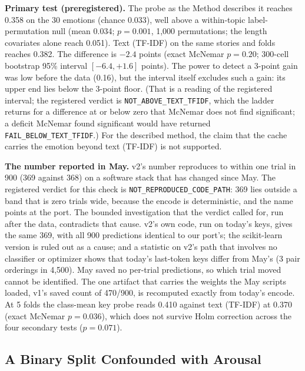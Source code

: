 \textbf{Primary test (preregistered).} The probe as the Method describes it reaches 0.358 on the 30 emotions (chance 0.033), well above a within-topic label-permutation null (mean 0.034; $p = 0.001$, 1{,}000 permutations; the length covariates alone reach 0.051). Text (TF-IDF) on the same stories and folds reaches 0.382. The difference is $-2.4$ points (exact McNemar $p = 0.20$; 300-cell bootstrap 95\% interval $[-6.4, +1.6]$ points). The power to detect a 3-point gain was low before the data (0.16), but the interval itself excludes such a gain: its upper end lies below the 3-point floor. (That is a reading of the registered interval; the registered verdict is \texttt{NOT\_ABOVE\_TEXT\_TFIDF}, which the ladder returns for a difference at or below zero that McNemar does not find significant; a deficit McNemar found significant would have returned \texttt{FAIL\_BELOW\_TEXT\_TFIDF}.) For the described method, the claim that the cache carries the emotion beyond text (TF-IDF) is not supported.

\textbf{The number reported in May.} v2's number reproduces to within one trial in 900 (369 against 368) on a software stack that has changed since May. The registered verdict for this check is \texttt{NOT\_REPRODUCED\_CODE\_PATH}: 369 lies outside a band that is zero trials wide, because the encode is deterministic, and the name points at the port. The bounded investigation that the verdict called for, run after the data, contradicts that cause. v2's own code, run on today's keys, gives the same 369, with all 900 predictions identical to our port's; the scikit-learn version is ruled out as a cause; and a statistic on v2's path that involves no classifier or optimizer shows that today's last-token keys differ from May's (3 pair orderings in 4{,}500). May saved no per-trial predictions, so which trial moved cannot be identified. The one artifact that carries the weights the May scripts loaded, v1's saved count of 470/900, is recomputed exactly from today's encode. At 5 folds the class-mean key probe reads 0.410 against text (TF-IDF) at 0.370 (exact McNemar $p = 0.036$), which does not survive Holm correction across the four secondary tests ($p = 0.071$).

\subsection{A Binary Split Confounded with Arousal}
\label{sec:valence_split}

